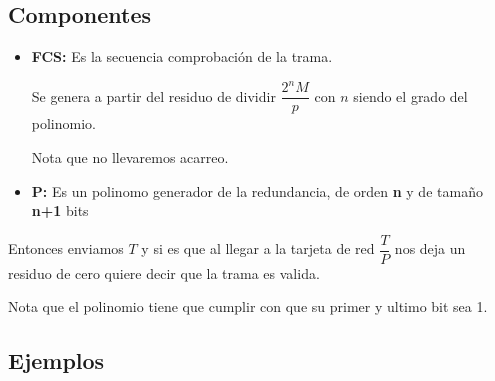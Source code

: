 \documentclass[12pt, fleqn]{report}                             %
\theoremstyle{break}                                            %
\begin{document}
                \subsection{Componentes}
                    
                    \begin{itemize}
                        \item 
                            \textbf{FCS:} Es la secuencia comprobación de la trama. 

                            Se genera a partir del residuo de dividir $\dfrac{2^n M}{p}$ con $n$ siendo
                            el grado del polinomio. 

                            Nota que no llevaremos acarreo.

                        \item
                            \textbf{P:} Es un polinomo generador de la redundancia, de orden \textbf{n}
                            y de tamaño \textbf{n+1} bits

                    \end{itemize}

                    Entonces enviamos $T$ y si es que al llegar a la tarjeta de red $\dfrac{T}{P}$ nos deja
                    un residuo de cero quiere decir que la trama es valida.

                    Nota que el polinomio tiene que cumplir con que su primer y ultimo bit sea 1.


            \clearpage
            \subsection{Ejemplos}
\end{document}
